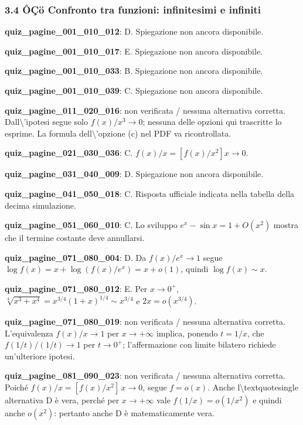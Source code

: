 \documentclass[11pt,a4paper]{article}
\newcounter{quiz}
\begin{document}
\subsubsection*{3.4 ÔÇö Confronto tra funzioni: infinitesimi e infiniti}
\noindent\textbf{quiz\_pagine\_001\_010\_012}: D. Spiegazione non ancora disponibile.\par\medskip
\noindent\textbf{quiz\_pagine\_001\_010\_017}: E. Spiegazione non ancora disponibile.\par\medskip
\noindent\textbf{quiz\_pagine\_001\_010\_033}: B. Spiegazione non ancora disponibile.\par\medskip
\noindent\textbf{quiz\_pagine\_001\_010\_039}: C. Spiegazione non ancora disponibile.\par\medskip
\noindent\textbf{quiz\_pagine\_011\_020\_016}: non verificata / nessuna alternativa corretta. Dall\textbackslash{}'ipotesi segue solo $f(x)/x^3\to0$; nessuna delle opzioni qui trascritte lo esprime. La formula dell\textbackslash{}'opzione (c) nel PDF va ricontrollata.\par\medskip
\noindent\textbf{quiz\_pagine\_021\_030\_036}: C. $f(x)/x=[f(x)/x^2]x\to0$.\par\medskip
\noindent\textbf{quiz\_pagine\_031\_040\_009}: D. Spiegazione non ancora disponibile.\par\medskip
\noindent\textbf{quiz\_pagine\_041\_050\_018}: C. Risposta ufficiale indicata nella tabella della decima simulazione.\par\medskip
\noindent\textbf{quiz\_pagine\_051\_060\_010}: C. Lo sviluppo $e^x-\sin x=1+O(x^2)$ mostra che il termine costante deve annullarsi.\par\medskip
\noindent\textbf{quiz\_pagine\_071\_080\_004}: D. Da $f(x)/e^x\to1$ segue $\log f(x)=x+\log(f(x)/e^x)=x+o(1)$, quindi $\log f(x)\sim x$.\par\medskip
\noindent\textbf{quiz\_pagine\_071\_080\_012}: E. Per $x\to0^+$, $\sqrt[4]{x^3+x^4}=x^{3/4}(1+x)^{1/4}\sim x^{3/4}$ e $2x=o(x^{3/4})$.\par\medskip
\noindent\textbf{quiz\_pagine\_071\_080\_019}: non verificata / nessuna alternativa corretta. L'equivalenza $f(x)/x\to1$ per $x\to+\infty$ implica, ponendo $t=1/x$, che $f(1/t)/(1/t)\to1$ per $t\to0^+$; l'affermazione con limite bilatero richiede un'ulteriore ipotesi.\par\medskip
\noindent\textbf{quiz\_pagine\_081\_090\_023}: non verificata / nessuna alternativa corretta. Poiché $f(x)/x=[f(x)/x^2]\,x\to0$, segue $f=o(x)$. Anche l\textbackslash{}textquotesingle alternativa D è vera, perché per $x\to+\infty$ vale $f(1/x)=o(1/x^2)$ e quindi anche $o(x^2)$: pertanto anche D è matematicamente vera.\par\medskip
\end{document}
